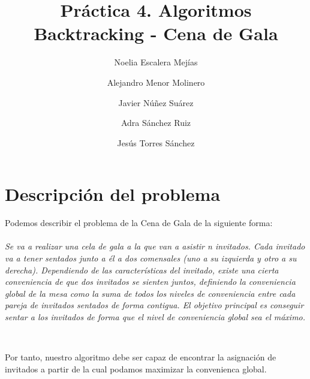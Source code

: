 \documentclass{article}
\title{Práctica 4. Algoritmos Backtracking - Cena de Gala}
\author{Noelia Escalera Mejías \\
	\and Alejandro Menor Molinero \\
	\and Javier Núñez Suárez \\
	\and Adra Sánchez Ruiz \\
	\and Jesús Torres Sánchez}
\begin{document}
	\maketitle
	\section{Descripción del problema}
	Podemos describir el problema de la Cena de Gala de la siguiente forma:
	\\ 
	\\
	\textit{Se va a realizar una cela de gala a la que van a asistir n invitados. Cada invitado va a tener sentados junto a él a dos comensales (uno a su izquierda y otro a su derecha). Dependiendo de las características del invitado, existe una cierta conveniencia de que dos invitados se sienten juntos, definiendo la conveniencia global de la mesa como la suma de todos los niveles de conveniencia entre cada pareja de invitados sentados de forma contigua. El objetivo principal es conseguir sentar a los invitados de forma que el nivel de conveniencia global sea el máximo.}
	
	\
	
	Por tanto, nuestro algoritmo debe ser capaz de encontrar la asignación de invitados a partir de la cual podamos maximizar la convenienca global.
	
\end{document}

